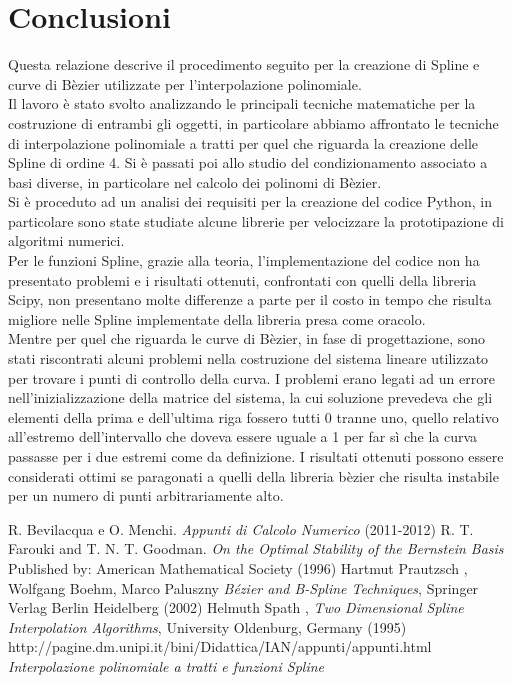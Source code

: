\documentclass[a4paper,12pt]{report}
\theoremstyle{definition}
\begin{document}
\chapter*{Conclusioni}
Questa relazione descrive il procedimento seguito per la creazione di Spline e curve di Bèzier utilizzate per l'interpolazione polinomiale.\\
Il lavoro è stato svolto analizzando le principali tecniche matematiche per la costruzione di entrambi gli oggetti, in particolare abbiamo affrontato le tecniche di interpolazione polinomiale a tratti per quel che riguarda la creazione delle Spline di ordine 4. Si è passati poi allo studio del condizionamento associato a basi diverse, in particolare nel calcolo dei polinomi di Bèzier.\\ Si è proceduto ad un analisi dei requisiti per la creazione del codice Python, in particolare sono state studiate alcune librerie per velocizzare la prototipazione di algoritmi numerici.\\
Per le funzioni Spline, grazie alla teoria, l'implementazione del codice non ha presentato problemi e i risultati ottenuti, confrontati con quelli della libreria Scipy, non presentano molte differenze a parte per il costo in tempo che risulta migliore nelle Spline implementate della libreria presa come oracolo.\\
Mentre per quel che riguarda le curve di Bèzier, in fase di progettazione, sono stati riscontrati alcuni problemi nella costruzione del sistema lineare utilizzato per trovare i punti di controllo della curva. I problemi erano legati ad un errore nell'inizializzazione della matrice del sistema, la cui soluzione prevedeva che gli elementi della prima e dell'ultima riga fossero tutti 0 tranne uno, quello relativo all'estremo dell'intervallo che doveva essere uguale a 1 per far sì che la curva passasse per i due estremi come da definizione. I risultati ottenuti possono essere considerati ottimi se paragonati a quelli della libreria bèzier che risulta instabile per un numero di punti arbitrariamente alto.\\


\begin{thebibliography}{}
	 R. Bevilacqua e O. Menchi. \emph{Appunti di Calcolo Numerico} (2011-2012)
	 R. T. Farouki and T. N. T. Goodman. \emph{On the Optimal Stability of the Bernstein Basis} Published by: American Mathematical Society (1996)
	 Hartmut Prautzsch , Wolfgang Boehm, Marco Paluszny \emph{Bézier and B-Spline Techniques}, Springer Verlag Berlin Heidelberg (2002)
	 Helmuth Spath , \emph{Two Dimensional Spline Interpolation Algorithms}, University Oldenburg, Germany (1995)
	 http://pagine.dm.unipi.it/bini/Didattica/IAN/appunti/appunti.html
	\emph{Interpolazione polinomiale a tratti e funzioni Spline}
	
\end{thebibliography}
\end{document}
